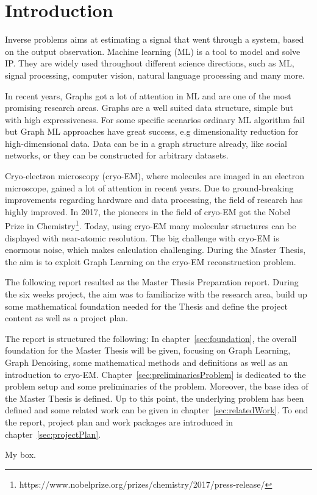 \chapter{Introduction}
\label{sec:introduction}

Inverse problems aims at estimating a signal that went through a system, based on the output observation.
Machine learning (ML) is a tool to model and solve IP.
They are widely used throughout different science directions, such as ML,
signal processing, computer vision, natural language processing and many more.

In recent years, Graphs got a lot of attention in ML and are one of the most promising research areas.
Graphs are a well suited data structure, simple but with high expressiveness. 
For some specific scenarios ordinary ML algorithm fail but Graph ML approaches have great success, e.g dimensionality reduction for high-dimensional data.
Data can be in a graph structure already, like social networks, or they can be constructed for arbitrary datasets.

Cryo-electron microscopy (cryo-EM), where molecules are imaged in an electron microscope,
gained a lot of attention in recent years. 
Due to ground-breaking improvements regarding hardware and data processing, the field of research
has highly improved. In 2017, the pioneers in the field of cryo-EM got the 
Nobel Prize in Chemistry\footnote{https://www.nobelprize.org/prizes/chemistry/2017/press-release/}.
Today, using cryo-EM many molecular structures can be displayed with near-atomic resolution.
The big challenge with cryo-EM is enormous noise, which makes calculation challenging. 
During the Master Thesis, the aim is to exploit Graph Learning on the cryo-EM reconstruction problem.

\bigskip

The following report resulted as the Master Thesis Preparation report. During the six weeks project, 
the aim was to familiarize with the research area, build up some mathematical foundation needed 
for the Thesis and define the project content as well as a project plan.

\bigskip

The report is structured the following:
In chapter~\ref{sec:foundation}, the overall foundation for the Master Thesis will be given, focusing 
on Graph Learning, Graph Denoising, some mathematical methods and definitions as well as an 
introduction to cryo-EM.
Chapter~\ref{sec:preliminariesProblem} is dedicated to the problem setup and some preliminaries of the problem. 
Moreover, the base idea of the Master Thesis is defined.
Up to this point, the underlying problem has been defined and some related work can be given in chapter~\ref{sec:relatedWork}.
To end the report, project plan and work packages are introduced in chapter~\ref{sec:projectPlan}.


\begin{tcolorbox}[colback=red!5!white,colframe=red!75!black]
    My box.
\end{tcolorbox}

